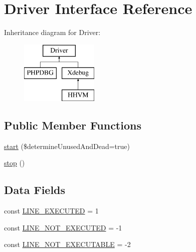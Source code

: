 \hypertarget{interface_sebastian_bergmann_1_1_code_coverage_1_1_driver_1_1_driver}{}\section{Driver Interface Reference}
\label{interface_sebastian_bergmann_1_1_code_coverage_1_1_driver_1_1_driver}
Inheritance diagram for Driver\+:\begin{figure}[H]
\begin{center}
\leavevmode
\includegraphics[height=3.000000cm]{interface_sebastian_bergmann_1_1_code_coverage_1_1_driver_1_1_driver}
\end{center}
\end{figure}
\subsection*{Public Member Functions}
\begin{DoxyCompactItemize}
\item 
\mbox{\hyperlink{interface_sebastian_bergmann_1_1_code_coverage_1_1_driver_1_1_driver_aa3dfff26cb483c3eadbf2418e1729671}{start}} (\$determine\+Unused\+And\+Dead=true)
\item 
\mbox{\hyperlink{interface_sebastian_bergmann_1_1_code_coverage_1_1_driver_1_1_driver_a8b6fc76a620d7557d06e9a11a9ffb509}{stop}} ()
\end{DoxyCompactItemize}
\subsection*{Data Fields}
\begin{DoxyCompactItemize}
\item 
const \mbox{\hyperlink{interface_sebastian_bergmann_1_1_code_coverage_1_1_driver_1_1_driver_a6be8653d294ab41f4e6f0595f6f46f1c}{L\+I\+N\+E\+\_\+\+E\+X\+E\+C\+U\+T\+ED}} = 1
\item 
const \mbox{\hyperlink{interface_sebastian_bergmann_1_1_code_coverage_1_1_driver_1_1_driver_a9df1e7dc495d05864939fcdb38336b1c}{L\+I\+N\+E\+\_\+\+N\+O\+T\+\_\+\+E\+X\+E\+C\+U\+T\+ED}} = -\/1
\item 
const \mbox{\hyperlink{interface_sebastian_bergmann_1_1_code_coverage_1_1_driver_1_1_driver_aa6556d04d56e881f123b9099bd44b839}{L\+I\+N\+E\+\_\+\+N\+O\+T\+\_\+\+E\+X\+E\+C\+U\+T\+A\+B\+LE}} = -\/2
\end{DoxyCompactItemize}


